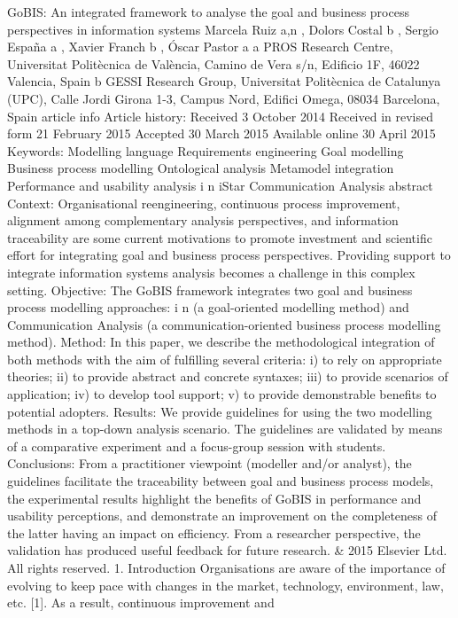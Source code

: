 GoBIS: An integrated framework to analyse the goal
and business process perspectives in information systems
Marcela Ruiz a,n
, Dolors Costal b
, Sergio España a
, Xavier Franch b
, Óscar Pastor a
a
PROS Research Centre, Universitat Politècnica de València, Camino de Vera s/n, Edificio 1F, 46022 Valencia, Spain
b GESSI Research Group, Universitat Politècnica de Catalunya (UPC), Calle Jordi Girona 1-3, Campus Nord, Edifici Omega,
08034 Barcelona, Spain
article info
Article history:
Received 3 October 2014
Received in revised form
21 February 2015
Accepted 30 March 2015
Available online 30 April 2015
Keywords:
Modelling language
Requirements engineering
Goal modelling
Business process modelling
Ontological analysis
Metamodel integration
Performance and usability analysis
i
n
iStar
Communication Analysis
abstract
Context: Organisational reengineering, continuous process improvement, alignment
among complementary analysis perspectives, and information traceability are some
current motivations to promote investment and scientific effort for integrating goal and
business process perspectives. Providing support to integrate information systems
analysis becomes a challenge in this complex setting.
Objective: The GoBIS framework integrates two goal and business process modelling
approaches: i
n
(a goal-oriented modelling method) and Communication Analysis (a
communication-oriented business process modelling method).
Method: In this paper, we describe the methodological integration of both methods with
the aim of fulfilling several criteria: i) to rely on appropriate theories; ii) to provide
abstract and concrete syntaxes; iii) to provide scenarios of application; iv) to develop tool
support; v) to provide demonstrable benefits to potential adopters.
Results: We provide guidelines for using the two modelling methods in a top-down
analysis scenario. The guidelines are validated by means of a comparative experiment and
a focus-group session with students.
Conclusions: From a practitioner viewpoint (modeller and/or analyst), the guidelines
facilitate the traceability between goal and business process models, the experimental
results highlight the benefits of GoBIS in performance and usability perceptions, and
demonstrate an improvement on the completeness of the latter having an impact on
efficiency. From a researcher perspective, the validation has produced useful feedback for
future research.
& 2015 Elsevier Ltd. All rights reserved.
1. Introduction
Organisations are aware of the importance of evolving to
keep pace with changes in the market, technology, environment, law, etc. [1]. As a result, continuous improvement and

